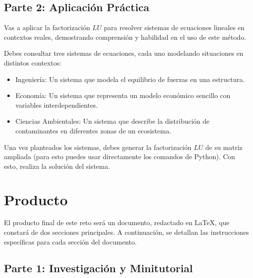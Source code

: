 \documentclass[a4,11pt]{aleph-notas}
\begin{document}
\subsection{Parte 2: Aplicación Práctica}

Vas a aplicar la factorización $LU$ para resolver sistemas de ecuaciones lineales en contextos reales, demostrando comprensión y habilidad en el uso de este método.

Debes consultar tres sistemas de ecuaciones, cada uno modelando situaciones en distintos contextos:
\begin{itemize}
\item 
    Ingeniería: Un sistema que modela el equilibrio de fuerzas en una estructura.
\item 
    Economía: Un sistema que representa un modelo económico sencillo con variables interdependientes.
\item 
    Ciencias Ambientales: Un sistema que describe la distribución de contaminantes en diferentes zonas de un ecosistema.
\end{itemize}

Una vez planteados los sistemas, debes generar la factorización $LU$ de su matriz ampliada (para esto puedes usar directamente los comandos de Python). Con esto, realiza la solución del sistema.

\section{Producto}

El producto final de este reto será un documento, redactado en \LaTeX, que constará de dos secciones principales. A continuación, se detallan las instrucciones específicas para cada sección del documento.

\subsection{Parte 1: Investigación y Minitutorial}
\end{document}
